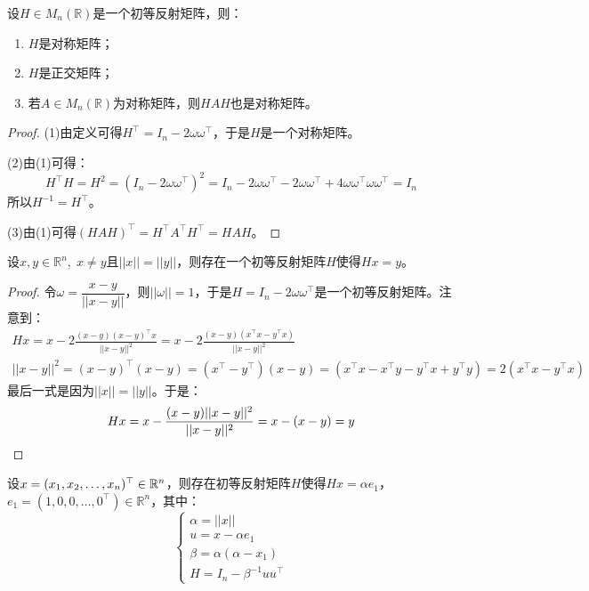 \begin{property}\label{prop:Householder}
	设$H\in M_{n}(\mathbb{R})$是一个初等反射矩阵，则：
	\begin{enumerate}
		\item $H$是对称矩阵；
		\item $H$是正交矩阵；
		\item 若$A\in M_{n}(\mathbb{R})$为对称矩阵，则$HAH$也是对称矩阵。
	\end{enumerate}
\end{property}
\begin{proof}
	(1)由定义可得$H^{\top}=I_n-2\omega\omega^{\top}$，于是$H$是一个对称矩阵。\par
	(2)由(1)可得：
	\begin{equation*}
		H^{\top}H=H^2=(I_n-2\omega\omega^{\top})^2=I_n-2\omega\omega^{\top}-2\omega\omega^{\top}+4\omega\omega^{\top}\omega\omega^{\top}=I_n
	\end{equation*}
	所以$H^{-1}=H^{\top}$。\par
	(3)由(1)可得$(HAH)^{\top}=H^{\top}A^{\top}H^{\top}=HAH$。
\end{proof}
\begin{theorem}\label{theo:HouseholderExistence}
	设$x,y\in\mathbb{R}^{n},\;x\ne y$且$||x||=||y||$，则存在一个初等反射矩阵$H$使得$Hx=y$。
\end{theorem}
\begin{proof}
	令$\omega=\dfrac{x-y}{||x-y||}$，则$||\omega||=1$，于是$H=I_n-2\omega\omega^{\top}$是一个初等反射矩阵。注意到：
	\begin{gather*}
		Hx=x-2\frac{(x-y)(x-y)^{\top}x}{||x-y||^2}=x-2\frac{(x-y)(x^{\top}x-y^{\top}x)}{||x-y||^2} \\
		||x-y||^2=(x-y)^{\top}(x-y)=(x^{\top}-y^{\top})(x-y)=(x^{\top}x-x^{\top}y-y^{\top}x+y^{\top}y)=2(x^{\top}x-y^{\top}x)
	\end{gather*}
	最后一式是因为$||x||=||y||$。于是：
	\begin{equation*}
		Hx=x-\frac{(x-y)||x-y||^2}{||x-y||^2}=x-(x-y)=y\qedhere
	\end{equation*}
\end{proof}
\begin{theorem}[$H$约化定理]\label{theo:Householder}
	设$x=(x_1, x_2, \dots, x_{n})^{\top}\in\mathbb{R}^{n}$，则存在初等反射矩阵$H$使得$Hx=\alpha e_1$，$e_1=(1,0,0,\dots,0^{\top})\in\mathbb{R}^{n}$，其中：
	\begin{equation*}
		\begin{cases}
			\alpha=||x|| \\
			u=x-\alpha e_1 \\
			\beta=\alpha(\alpha-x_1) \\
			H=I_n-\beta^{-1}uu^{\top}
		\end{cases}
	\end{equation*}
\end{theorem}
